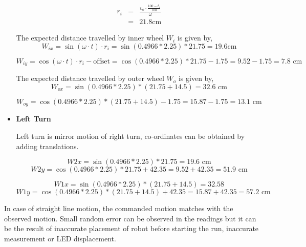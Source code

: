\begin{itemize}
\begin{equation}
\begin{array}{rcl}
r_i &=& \frac{v_o \cdot \frac{100 - t_r}{100}}{\omega} \\
&=& 21.8 \text{cm}
\end{array}
\end{equation}

The expected distance travelled by inner wheel $W_i$ is given by,
\begin{equation}
W_{ix} = \sin(\omega \cdot t) \cdot r_i = \sin(0.4966 * 2.25) * 21.75 = 19.6 \text{cm}
\end{equation}

\begin{equation}
W_{iy} = \cos(\omega \cdot t) \cdot r_i - \text{offset} =  \cos(0.4966 * 2.25) * 21.75 - 1.75 = 9.52 - 1.75 = 7.8 \text{ cm}
\end{equation}

The expected distance travelled by outer wheel $W_o$ is given by,
\begin{equation}
W_{ox} = \sin(0.4966 * 2.25) * (21.75 + 14.5) = 32.6 \text{ cm}
\end{equation}

\begin{equation}
W_{oy} = \cos(0.4966 * 2.25) * (21.75 + 14.5) - 1.75 = 15.87 - 1.75 = 13.1 \text{ cm}
\end{equation}

	\item \textbf{Left Turn}
	
	Left turn is mirror motion of right turn, co-ordinates can be obtained by adding translations. 
	
	$$W2x = \sin(0.4966 * 2.25) * 21.75 = 19.6 \text{ cm}$$
	$$W2y = \cos(0.4966 * 2.25) * 21.75 + 42.35 = 9.52 + 42.35 = 51.9 \text{ cm}$$
	
	$$W1x = \sin(0.4966 * 2.25) * (21.75 + 14.5) = 32.58$$
	$$W1y = \cos(0.4966 * 2.25) * (21.75 + 14.5) + 42.35 = 15.87 + 42.35 = 57.2 \text{ cm}$$
	
	
\end{itemize}

In case of straight line motion, the commanded motion matches with the observed motion. Small random error can be observed in the readings but it can be the result of inaccurate placement of robot before starting the run, inaccurate measurement or LED displacement. 

